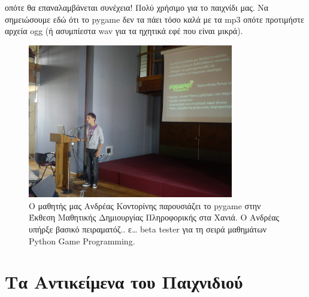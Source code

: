 οπότε θα επαναλαμβάνεται συνέχεια! Πολύ χρήσιμο για το παιχνίδι μας. Να σημειώσουμε εδώ ότι το pygame δεν τα πάει τόσο καλά με τα mp3 οπότε προτιμήστε αρχεία ogg (ή ασυμπίεστα wav για τα ηχητικά εφέ που είναι μικρά).

\begin{figure}
\centering
\includegraphics[width=0.8\textwidth]{images/chapter7/andreas}
\caption[Παρουσίαση Pygame]{Ο μαθητής μας Ανδρέας Κοντορίνης παρουσιάζει το pygame στην Έκθεση Μαθητικής Δημιουργίας Πληροφορικής στα Χανιά. Ο Ανδρέας υπήρξε βασικό πειραματόζ.. ε\ldots{} beta tester για τη σειρά μαθημάτων Python Game Programming.}
\label{7-1}
\end{figure}

\section{Τα Αντικείμενα του Παιχνιδιού}

